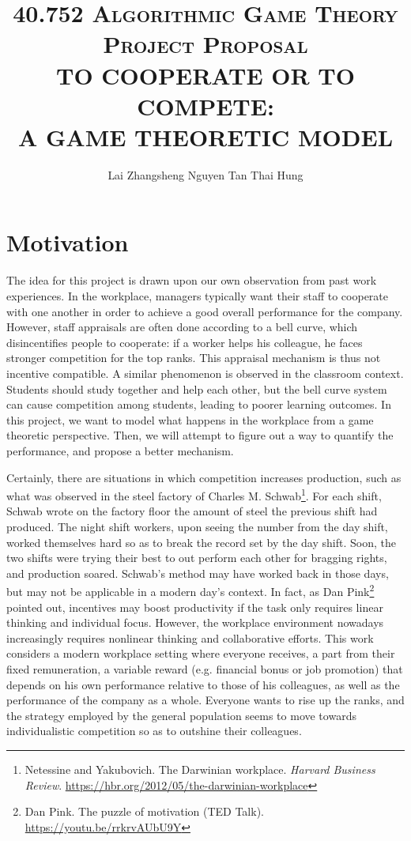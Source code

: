 \documentclass[11pt, a4paper]{article}
\title{
	\vspace*{-1.5cm}
	\scshape 40.752 Algorithmic Game Theory\\
	\vspace{0.5cm}
	Project Proposal\\
	\vspace{0.5cm}
	{\bfseries\Large TO COOPERATE OR TO COMPETE: \\
		A GAME THEORETIC MODEL}\\
	\vspace{0.5cm}}
\author{Lai Zhangsheng \qquad \qquad Nguyen Tan Thai Hung}
\date{}
\begin{document}
	
	\maketitle
	
	
	\section{Motivation}
	The idea for this project is drawn upon our own observation from past work experiences. In the workplace, managers typically want their staff to cooperate with one another in order to achieve a good overall performance for the company. However, staff appraisals are often done according to a bell curve, which disincentifies people to cooperate: if a worker helps his colleague, he faces stronger competition for the top ranks. This appraisal mechanism is thus not incentive compatible. A similar phenomenon is observed in the classroom context. Students should study together and help each other, but the bell curve system can cause competition among students, leading to poorer learning outcomes. In this project, we want to model what happens in the workplace from a game theoretic perspective. Then, we will attempt to figure out a way to quantify the performance, and propose a better mechanism. 
	
	Certainly, there are situations in which competition increases production, such as what was observed in the steel factory of Charles M. Schwab\footnote{Netessine and Yakubovich. The Darwinian workplace. \textit{Harvard Business Review}. \url{https://hbr.org/2012/05/the-darwinian-workplace}}. For each shift, Schwab wrote on the factory floor the amount of steel the previous shift had produced. The night shift workers, upon seeing the number from the day shift, worked themselves hard so as to break the record set by the day shift. Soon, the two shifts were trying their best to out perform each other for bragging rights, and production soared. Schwab's method may have worked back in those days, but may not be applicable in a modern day's context. In fact, as Dan Pink\footnote{Dan Pink. The puzzle of motivation (TED Talk). \url{https://youtu.be/rrkrvAUbU9Y}} pointed out, incentives may boost productivity if the task only requires linear thinking and individual focus. However, the workplace environment nowadays increasingly requires nonlinear thinking and collaborative efforts. This work considers a modern workplace setting where everyone receives, a part from their fixed remuneration, a variable reward (e.g. financial bonus or job promotion) that depends on his own performance relative to those of his colleagues, as well as the performance of the company as a whole. Everyone wants to rise up the ranks, and the strategy employed by the general population seems to move towards individualistic competition so as to outshine their colleagues.
	
\end{document}
